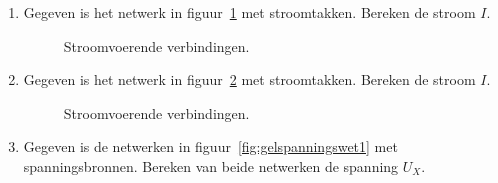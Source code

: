 

\begin{enumerate}[labelindent=0pt,labelwidth=\widthof{8.88.\ },label=\textbf{\thechapter.\arabic*.},leftmargin=!,ref=\thechapter.\arabic*]

\setcounter{figure}{0}
\setcounter{table}{0}
\setcounter{equation}{0}
\setcounter{lstlisting}{0}
\makeatletter 
\renewcommand{\thefigure}{P\thechapter.\@arabic\c@figure}
\renewcommand{\thetable}{P\thechapter.\@arabic\c@table}
\renewcommand{\theequation}{P\thechapter.\@arabic\c@equation}
\renewcommand{\thelstlisting}{P\thechapter.\@arabic\c@lstlisting}
\makeatother

\item
\label{que:gelstroomwet1}
Gegeven is het netwerk in figuur~\ref{fig:gelstroomwet1} met stroomtakken. Bereken de stroom $I$.

\begin{figure}[!ht]
\centering
{}
\caption{Stroomvoerende verbindingen.}
\label{fig:gelstroomwet1}
\end{figure}


\item
\label{que:gelstroomwet2}
Gegeven is het netwerk in figuur~\ref{fig:gelstroomwet2} met stroomtakken. Bereken de stroom $I$.

\begin{figure}[!ht]
\centering
{}
\caption{Stroomvoerende verbindingen.}
\label{fig:gelstroomwet2}
\end{figure}

\item
\label{que:gelspanningswet1}
Gegeven is de netwerken in figuur~\ref{fig:gelspanningswet1} met spanningsbronnen. Bereken van beide netwerken de spanning $U_X$.


\end{enumerate}
